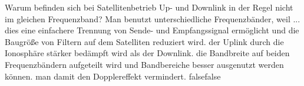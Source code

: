     {Warum befinden sich bei Satellitenbetrieb Up- und Downlink in der Regel nicht im gleichen Frequenzband? Man benutzt unterschiedliche Frequenzbänder, weil ...}
    {dies eine einfachere Trennung von Sende- und Empfangssignal ermöglicht und die Baugröße von Filtern auf dem Satelliten reduziert wird.}
    {der Uplink durch die Ionosphäre stärker bedämpft wird als der Downlink.}
    {die Bandbreite auf beiden Frequenzbändern aufgeteilt wird und Bandbereiche besser ausgenutzt werden können. }
    {man damit den Dopplereffekt vermindert.}
    {false}{false}